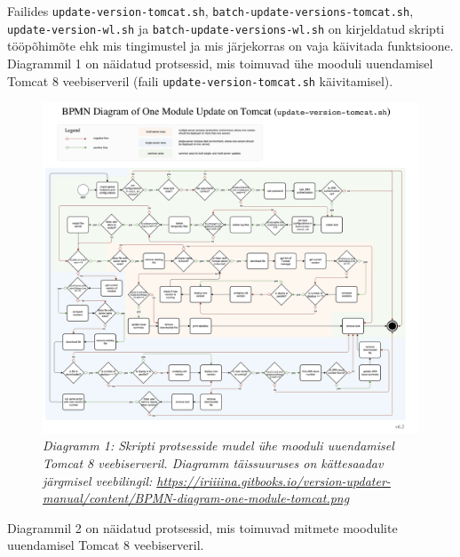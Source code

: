 \documentclass[12pt]{report}
\newcommand{\code}[1]{\texttt{#1}}
\begin{document}
   Failides \code{update-version-tomcat.sh}, \code{batch-update-versions-tomcat.sh}, \code{update-version-wl.sh} ja \code{batch-update-versions-wl.sh} on kirjeldatud skripti tööpõhimõte ehk mis tingimustel ja mis järjekorras on vaja käivitada funktsioone. Diagrammil 1 on näidatud protsessid, mis toimuvad ühe mooduli uuendamisel Tomcat 8 veebiserveril (faili \code{update-version-tomcat.sh} käivitamisel).
   
   \begin{figure}[H]
     \begin{center}
       \includegraphics[width=\textwidth]{diagrams/BPMN-diagram-one-module-tomcat.png}
       \caption*{\textit{Diagramm 1: Skripti protsesside mudel ühe mooduli uuendamisel Tomcat 8 veebiserveril. Diagramm täissuuruses on kättesaadav järgmisel veebilingil: \url{https://iriiiina.gitbooks.io/version-updater-manual/content/BPMN-diagram-one-module-tomcat.png}}}
     \end{center}
   \end{figure}
   
   Diagrammil 2 on näidatud protsessid, mis toimuvad mitmete moodulite uuendamisel Tomcat 8 veebiserveril.
   
\end{document}
